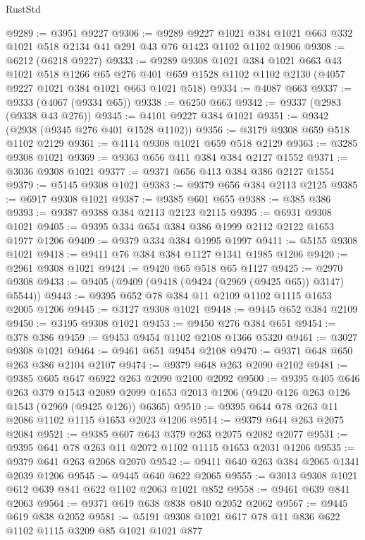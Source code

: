 \begin{lexlean}{RustStd}
\begin{coremodule}
@9289 := @3951 @9227
@9306 := @9289
    @9227
    @1021
    @384
    @1021
    @663
    @332
    @1021
    @518
    @2134
    @41
    @291
    @43
    @76
    @1423
    @1102
    @1102
    @1906
@9308 := @6212 (@6218 @9227)
@9333 := @9289
    @9308
    @1021
    @384
    @1021
    @663
    @43
    @1021
    @518
    @1266
    @65
    @276
    @401
    @659
    @1528
    @1102
    @1102
    @2130
    (@4057 @9227 @1021 @384 @1021 @663 @1021 @518)
@9334 := @4087 @663
@9337 := @9333 (@4067 (@9334 @65))
@9338 := @6250 @663
@9342 := @9337 (@2983 (@9338 @43 @276))
@9345 := @4101 @9227 @384 @1021
@9351 := @9342 (@2938 (@9345 @276 @401 @1528 @1102))
@9356 := @3179 @9308 @659 @518 @1102 @2129
@9361 := @4114 @9308 @1021 @659 @518 @2129
@9363 := @3285 @9308 @1021
@9369 := @9363 @656 @411 @384 @384 @2127 @1552
@9371 := @3036 @9308 @1021
@9377 := @9371 @656 @413 @384 @386 @2127 @1554
@9379 := @5145 @9308 @1021
@9383 := @9379 @656 @384 @2113 @2125
@9385 := @6917 @9308 @1021
@9387 := @9385 @601 @655
@9388 := @385 @386
@9393 := @9387 @9388 @384 @2113 @2123 @2115
@9395 := @6931 @9308 @1021
@9405 := @9395 @334 @654 @384 @386 @1999 @2112 @2122 @1653 @1977 @1206
@9409 := @9379 @334 @384 @1995 @1997
@9411 := @5155 @9308 @1021
@9418 := @9411 @76 @384 @384 @1127 @1341 @1985 @1206
@9420 := @2961 @9308 @1021
@9424 := @9420 @65 @518 @65 @1127
@9425 := @2970 @9308
@9433 := @9405 (@9409 (@9418 (@9424 (@2969 (@9425 @65)) @3147) @5544))
@9443 := @9395 @652 @78 @384 @11 @2109 @1102 @1115 @1653 @2005 @1206
@9445 := @3127 @9308 @1021
@9448 := @9445 @652 @384 @2109
@9450 := @3195 @9308 @1021
@9453 := @9450 @276 @384 @651
@9454 := @378 @386
@9459 := @9453 @9454 @1102 @2108 @1366 @5320
@9461 := @3027 @9308 @1021
@9464 := @9461 @651 @9454 @2108
@9470 := @9371 @648 @650 @263 @386 @2104 @2107
@9474 := @9379 @648 @263 @2090 @2102
@9481 := @9385 @605 @647 @6922 @263 @2090 @2100 @2092
@9500 := @9395
    @405
    @646
    @263
    @379
    @1543
    @2089
    @2099
    @1653
    @2013
    @1206
    (@9420 @126 @263 @126 @1543 (@2969 (@9425 @126)) @6365)
@9510 := @9395 @644 @78 @263 @11 @2086 @1102 @1115 @1653 @2023 @1206
@9514 := @9379 @644 @263 @2075 @2084
@9521 := @9385 @607 @643 @379 @263 @2075 @2082 @2077
@9531 := @9395 @641 @78 @263 @11 @2072 @1102 @1115 @1653 @2031 @1206
@9535 := @9379 @641 @263 @2068 @2070
@9542 := @9411 @640 @263 @384 @2065 @1341 @2039 @1206
@9545 := @9445 @640 @622 @2065
@9555 := @3013 @9308 @1021 @612 @639 @841 @622 @1102 @2063 @1021 @852
@9558 := @9461 @639 @841 @2063
@9564 := @9371 @619 @638 @838 @840 @2052 @2062
@9567 := @9445 @619 @838 @2052
@9581 := @5191 @9308 @1021 @617 @78 @11 @836 @622 @1102 @1115 @3209 @85 @1021 @1021 @877

\end{coremodule}
\end{lexlean}
